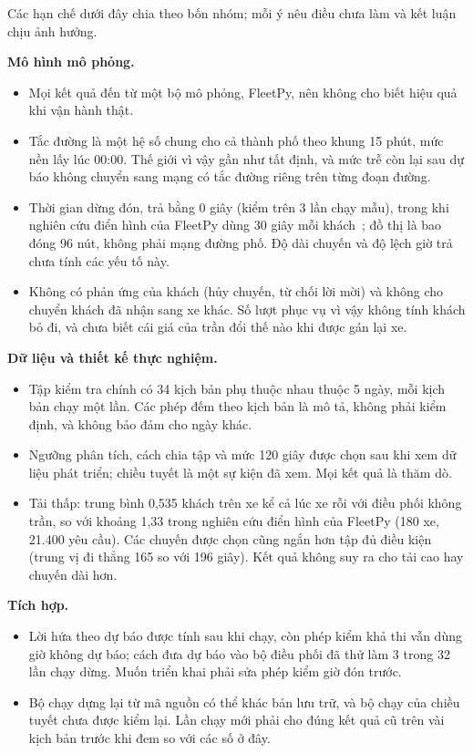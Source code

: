 Các hạn chế dưới đây chia theo bốn nhóm; mỗi ý nêu điều chưa làm và kết luận chịu ảnh hưởng.

\textbf{Mô hình mô phỏng.}
\begin{itemize}[leftmargin=1.2cm,itemsep=2pt,topsep=3pt]
\item Mọi kết quả đến từ một bộ mô phỏng, FleetPy, nên không cho biết hiệu quả khi vận hành thật.
\item Tắc đường là một hệ số chung cho cả thành phố theo khung 15 phút, mức nền lấy lúc 00:00. Thế giới vì vậy gần
như tất định, và mức trễ còn lại sau dự báo không chuyển sang mạng có tắc đường riêng trên từng đoạn đường.
\item Thời gian dừng đón, trả bằng 0 giây (kiểm trên 3 lần chạy mẫu), trong khi nghiên cứu điển hình của FleetPy dùng
30 giây mỗi khách~\cite{engelhardt2026}; đồ thị là bao đóng 96 nút, không phải mạng đường phố. Độ dài chuyến và độ
lệch giờ trả chưa tính các yếu tố này.
\item Không có phản ứng của khách (hủy chuyến, từ chối lời mời) và không cho chuyển khách đã nhận sang xe khác. Số
lượt phục vụ vì vậy không tính khách bỏ đi, và chưa biết cái giá của trần đổi thế nào khi được gán lại xe.
\end{itemize}

\textbf{Dữ liệu và thiết kế thực nghiệm.}
\begin{itemize}[leftmargin=1.2cm,itemsep=2pt,topsep=3pt]
\item Tập kiểm tra chính có 34 kịch bản phụ thuộc nhau thuộc 5 ngày, mỗi kịch bản chạy một lần. Các phép đếm theo
kịch bản là mô tả, không phải kiểm định, và không bảo đảm cho ngày khác.
\item Ngưỡng phân tích, cách chia tập và mức 120 giây được chọn sau khi xem dữ liệu phát triển; chiều tuyết là một sự
kiện đã xem. Mọi kết quả là thăm dò.
\item Tải thấp: trung bình 0,535 khách trên xe kể cả lúc xe rỗi với điều phối không trần, so với khoảng 1,33 trong
nghiên cứu điển hình của FleetPy (180 xe, 21.400 yêu cầu). Các chuyến được chọn cũng ngắn hơn tập đủ điều kiện (trung
vị đi thẳng 165 so với 196 giây). Kết quả không suy ra cho tải cao hay chuyến dài hơn.
\end{itemize}

\textbf{Tích hợp.}
\begin{itemize}[leftmargin=1.2cm,itemsep=2pt,topsep=3pt]
\item Lời hứa theo dự báo được tính sau khi chạy, còn phép kiểm khả thi vẫn dùng giờ không dự báo; cách đưa dự báo
vào bộ điều phối đã thử làm 3 trong 32 lần chạy dừng. Muốn triển khai phải sửa phép kiểm giờ đón trước.
\item Bộ chạy dựng lại từ mã nguồn có thể khác bản lưu trữ, và bộ chạy của chiều tuyết chưa được kiểm lại. Lần chạy
mới phải cho đúng kết quả cũ trên vài kịch bản trước khi đem so với các số ở đây.
\end{itemize}

